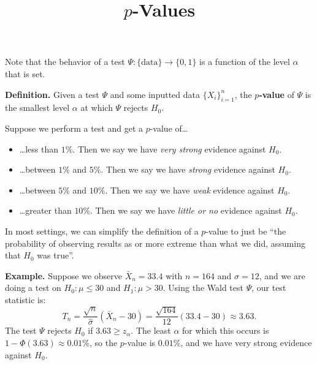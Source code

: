 \title{$p$-Values}



Note that the behavior of a test $\Psi: \{\mathrm{data}\} \to \{0, 1\}$
is a function of the level $\alpha$ that is set.

\textbf{Definition.}
Given a test $\Psi$ and some inputted data $\{X_i\}_{i = 1}^n$,
the \textbf{$p$-value} of $\Psi$ is the smallest level $\alpha$
at which $\Psi$ rejects $H_0$.

Suppose we perform a test and get a $p$-value of\dots
\begin{itemize}
    \item \dots less than $1\%$.
    Then we say we have \emph{very strong} evidence against $H_0$.
    \item \dots between $1\%$ and $5\%$.
    Then we say we have \emph{strong} evidence against $H_0$.
    \item \dots between $5\%$ and $10\%$.
    Then we say we have \emph{weak} evidence against $H_0$.
    \item \dots greater than $10\%$.
    Then we say we have \emph{little or no} evidence against $H_0$.
\end{itemize}

\begin{remark}
    In most settings,
    we can simplify the definition of a $p$-value
    to just be ``the probability of observing results as
    or more extreme than what we did,
    assuming that $H_0$ was true''.
\end{remark}

\textbf{Example.} Suppose we observe $\bar{X}_n = 33.4$ with $n = 164$ and $\hat{\sigma} = 12$,
and we are doing a test on $H_0: \mu \leq 30$ and $H_1: \mu > 30$.
Using the Wald test $\Psi$, our test statistic is:
\[ T_n = \frac{\sqrt{n}}{\hat{\sigma}}(\bar{X}_n - 30)
= \frac{\sqrt{164}}{12}(33.4 - 30) \approx 3.63. \]
The test $\Psi$ rejects $H_0$ if $3.63 \geq z_{\alpha}$.
The least $\alpha$ for which this occurs is $1 - \Phi(3.63) \approx 0.01\%$,
so the $p$-value is $0.01\%$, and we have very strong evidence against $H_0$.

